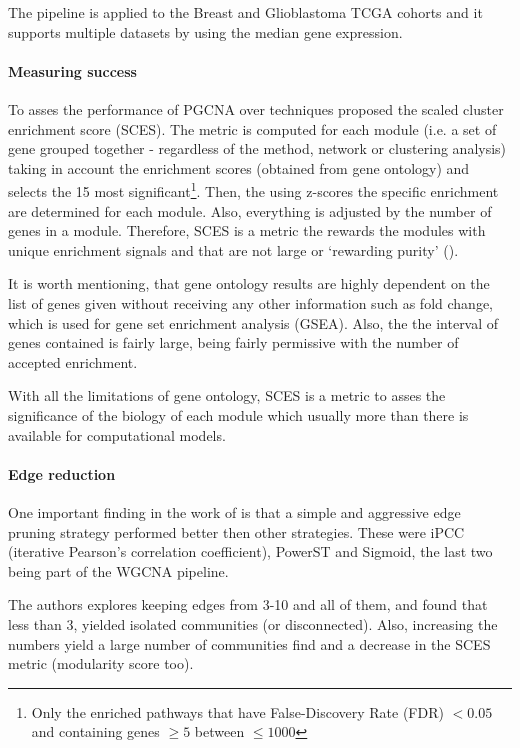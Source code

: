 
The pipeline is applied to the Breast and Glioblastoma TCGA cohorts and it supports multiple datasets by using the median gene expression.

\paragraph{Measuring success}

To asses the performance of PGCNA over techniques \citet{Care2019-ij} proposed the scaled cluster enrichment score (SCES). The metric is computed for each module (i.e. a set of gene grouped together - regardless of the method, network or clustering analysis) taking in account the enrichment scores (obtained from gene ontology) and selects the 15 most significant\footnote{Only the enriched pathways that have False-Discovery Rate (FDR) $<0.05$ and containing genes $\geq5$ between $\leq1000$}. Then, the using z-scores the specific enrichment are determined for each module. Also, everything is adjusted by the number of genes in a module. Therefore, SCES is a metric the rewards the modules with unique enrichment signals and that are not large or ‘rewarding purity' (\citet{Care2019-ij}).

It is worth mentioning, that gene ontology results are highly dependent on the list of genes given without receiving any other information such as fold change, which is used for gene set enrichment analysis (GSEA). Also, the the interval of genes contained is fairly large, being fairly permissive with the number of accepted enrichment.

With all the limitations of gene ontology, SCES is a metric to asses the significance of the biology of each module which usually more than there is available for computational models.

\paragraph{Edge reduction}

One important finding in the work of \citet{Care2019-ij} is that a simple and aggressive edge pruning strategy performed better then other strategies. These were iPCC (iterative Pearson’s correlation coefficient), PowerST and Sigmoid, the last two being part of the WGCNA pipeline.

The authors explores keeping edges from 3-10 and all of them, and found that less than 3, yielded isolated communities (or disconnected). Also, increasing the numbers yield a large number of communities find and a decrease in the SCES metric (modularity score too).

